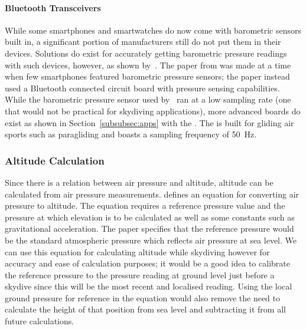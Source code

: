 \paragraph{Bluetooth Transceivers}\label{bluetooth-transceivers}
While some smartphones and smartwatches do now come with barometric sensors built in, a significant portion of manufacturers still do not put them in their devices. Solutions do exist for accurately getting barometric pressure readings with such devices, however, as shown by~\textcite{he_atmospheric_2012}. The paper from \citeyear{he_atmospheric_2012} was made at a time when few smartphones featured barometric pressure sensors; the paper instead used a Bluetooth connected circuit board with pressure sensing capabilities. While the barometric pressure sensor used by~\citeauthor{he_atmospheric_2012} ran at a low sampling rate (one that would not be practical for skydiving applications), more advanced boards do exist as shown in Section~\ref{subsubsec:apps} with the .
The  is built for gliding air sports such as paragliding and boasts a sampling frequency of \SI{50}{\Hz}.

\subsubsection{Altitude Calculation}\label{subsubsec:altitude-calculation}
Since there is a relation between air pressure and altitude, altitude can be calculated from air pressure measurements. \textcite{liu_beyond_2014} defines an equation for converting air pressure to altitude. The equation requires a reference pressure value and the pressure at which elevation is to be calculated as well as some constants such as gravitational acceleration. The paper specifies that the reference pressure would be the standard atmospheric pressure which reflects air pressure at sea level. We can use this equation for calculating altitude while skydiving however for accuracy and ease of calculation purposes; it would be a good idea to calibrate the reference pressure to the pressure reading at ground level just before a skydive since this will be the most recent and localised reading. Using the local ground pressure for reference in the equation would also remove the need to calculate the height of that position from sea level and subtracting it from all future calculations.

